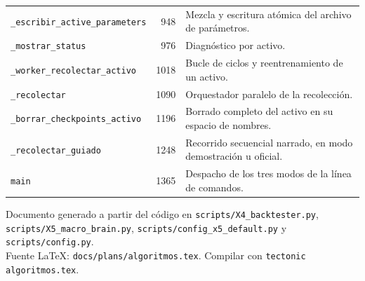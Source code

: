 \documentclass[11pt,a4paper]{article}
\newcommand{\code}[1]{\texttt{\small #1}}
\begin{document}
\begin{longtable}{@{}p{5.6cm} r p{\dimexpr\linewidth-7.7cm\relax}@{}}
\code{_escribir_active_parameters} & 948 & Mezcla y escritura atómica del archivo de parámetros. \\
\code{_mostrar_status} & 976 & Diagnóstico por activo. \\
\code{_worker_recolectar_activo} & 1018 & Bucle de ciclos y reentrenamiento de un activo. \\
\code{_recolectar} & 1090 & Orquestador paralelo de la recolección. \\
\code{_borrar_checkpoints_activo} & 1196 & Borrado completo del activo en su espacio de nombres. \\
\code{_recolectar_guiado} & 1248 & Recorrido secuencial narrado, en modo demostración u oficial. \\
\code{main} & 1365 & Despacho de los tres modos de la línea de comandos. \\
\bottomrule
\end{longtable}

\vspace{1cm}
\begin{center}
\small\color{cgris}
Documento generado a partir del código en \code{scripts/X4_backtester.py},
\code{scripts/X5_macro_brain.py}, \code{scripts/config_x5_default.py} y
\code{scripts/config.py}.\\
Fuente \LaTeX: \code{docs/plans/algoritmos.tex}. Compilar con \code{tectonic algoritmos.tex}.
\end{center}
\end{document}

